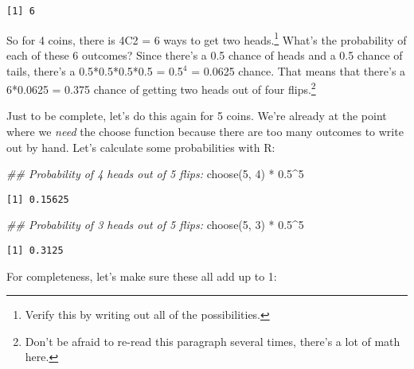 \documentclass[
  letterpaper,
  DIV=11,
  numbers=noendperiod]{scrreprt}
\newenvironment{Shaded}{\begin{snugshade}}{\end{snugshade}}
\newcommand{\DecValTok}[1]{\textcolor[rgb]{0.68,0.00,0.00}{#1}}
\newcommand{\DocumentationTok}[1]{\textcolor[rgb]{0.37,0.37,0.37}{\textit{#1}}}
\newcommand{\FloatTok}[1]{\textcolor[rgb]{0.68,0.00,0.00}{#1}}
\newcommand{\FunctionTok}[1]{\textcolor[rgb]{0.28,0.35,0.67}{#1}}
\newcommand{\NormalTok}[1]{\textcolor[rgb]{0.00,0.23,0.31}{#1}}
\newcommand{\SpecialCharTok}[1]{\textcolor[rgb]{0.37,0.37,0.37}{#1}}
\begin{document}
\begin{verbatim}
[1] 6
\end{verbatim}

So for 4 coins, there is 4C2 = 6 ways to get two heads.\footnote{Verify
  this by writing out all of the possibilities.} What's the probability
of each of these 6 outcomes? Since there's a 0.5 chance of heads and a
0.5 chance of tails, there's a 0.5*0.5*0.5*0.5 = 0.5\(^4\) = 0.0625
chance. That means that there's a 6*0.0625 = 0.375 chance of getting two
heads out of four flips.\footnote{Don't be afraid to re-read this
  paragraph several times, there's a lot of math here.}

Just to be complete, let's do this again for 5 coins. We're already at
the point where we \emph{need} the choose function because there are too
many outcomes to write out by hand. Let's calculate some probabilities
with R:

\begin{Shaded}
\begin{Highlighting}[]
\DocumentationTok{\#\# Probability of 4 heads out of 5 flips:}
\FunctionTok{choose}\NormalTok{(}\DecValTok{5}\NormalTok{, }\DecValTok{4}\NormalTok{) }\SpecialCharTok{*} \FloatTok{0.5}\SpecialCharTok{\^{}}\DecValTok{5}
\end{Highlighting}
\end{Shaded}

\begin{verbatim}
[1] 0.15625
\end{verbatim}

\begin{Shaded}
\begin{Highlighting}[]
\DocumentationTok{\#\# Probability of 3 heads out of 5 flips:}
\FunctionTok{choose}\NormalTok{(}\DecValTok{5}\NormalTok{, }\DecValTok{3}\NormalTok{) }\SpecialCharTok{*} \FloatTok{0.5}\SpecialCharTok{\^{}}\DecValTok{5}
\end{Highlighting}
\end{Shaded}

\begin{verbatim}
[1] 0.3125
\end{verbatim}

For completeness, let's make sure these all add up to 1:
\end{document}
